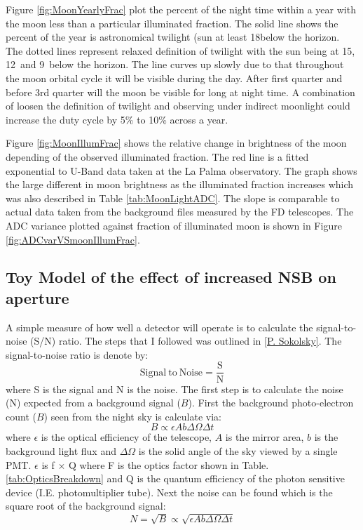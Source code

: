 Figure \ref{fig:MoonYearlyFrac} plot the percent of the night time within a year with the moon less than a particular illuminated fraction. The solid line shows the percent of the year is astronomical twilight (sun at least 18\textdegree below the horizon. The dotted lines represent relaxed definition of twilight with the sun being at 15\textdegree , 12\textdegree \ and 9\textdegree \ below the horizon. The line curves up slowly due to that throughout the moon orbital cycle it will be visible during the day. After first quarter and before 3rd quarter will the moon be visible for long at night time. A combination of loosen the definition of twilight and observing under indirect moonlight could increase the duty cycle by 5\% to 10\% across a year.


Figure \ref{fig:MoonIllumFrac} shows the relative change in brightness of the moon depending of the observed illuminated fraction. The red line is a fitted exponential to U-Band data taken at the La Palma observatory. The graph shows the large different in moon brightness as the illuminated fraction increases which was also described in Table \ref{tab:MoonLightADC}. The slope is comparable to actual data taken from the background files measured by the FD telescopes. The ADC variance plotted against fraction of illuminated moon is shown in Figure \ref{fig:ADCvarVSmoonIllumFrac}.


\subsection{Toy Model of the effect of increased NSB on aperture}

A simple measure of how well a detector will operate is to calculate the signal-to-noise (S/N) ratio. The steps that I followed was outlined in \ref{P. Sokolsky}. The signal-to-noise ratio is denote by:
\begin{equation}
\mathrm{Signal \ to \ Noise} = \frac{\mathrm{S}}{\mathrm{N}} \label{eq:SNratio}
\end{equation}
where S is the signal and N is the noise. The first step is to calculate the noise (N) expected from a background signal ($B$). First the background photo-electron count ($B$) seen from the night sky is calculate via:
\begin{equation}
B \propto \epsilon A b \Delta \Omega \Delta t \nonumber
\end{equation}
where $\epsilon$ is the optical efficiency of the telescope, $A$ is the mirror area, $b$ is the background light flux and $\Delta\Omega$ is the solid angle of the sky viewed by a single PMT. $\epsilon$ is f $\times$ Q where F is the optics factor shown in Table. \ref{tab:OpticsBreakdown} and Q is the quantum efficiency of the photon sensitive device (I.E. photomultiplier tube). Next the noise can be found which is the square root of the background signal:
\begin{equation}
N = \sqrt{B} \propto \sqrt{\epsilon A b \Delta \Omega \Delta t} \label{eq:DetectNoise}
\end{equation}

